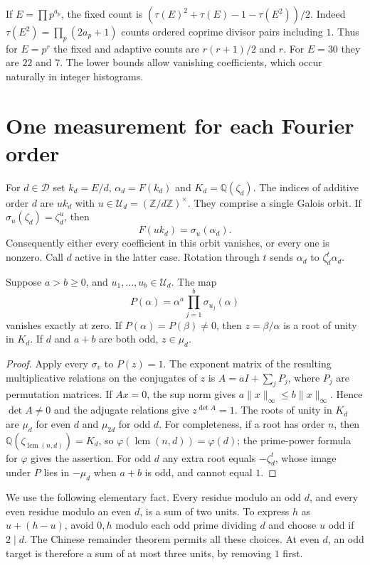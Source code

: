 \documentclass[11pt,letterpaper]{article}
\newcommand{\Z}{\mathbb Z}\newcommand{\Q}{\mathbb Q}\newcommand{\C}{\mathbb C}
\newcommand{\D}{\mathcal D}\newcommand{\U}{\mathcal U}
\DeclareMathOperator{\lcm}{lcm}
\begin{document}
If $E=\prod p^{a_p}$, the fixed count is $(\tau(E)^2+\tau(E)-1-\tau(E^2))/2$. Indeed $\tau(E^2)=\prod_p(2a_p+1)$ counts ordered coprime divisor pairs including $1$. Thus for $E=p^r$ the fixed and adaptive counts are $r(r+1)/2$ and $r$. For $E=30$ they are $22$ and $7$. The lower bounds allow vanishing coefficients, which occur naturally in integer histograms.

\newpage
\section{One measurement for each Fourier order}
For $d\in\D$ set $k_d=E/d$, $\alpha_d=F(k_d)$ and $K_d=\Q(\zeta_d)$. The indices of additive order $d$ are $uk_d$ with $u\in\U_d=(\Z/d\Z)^\times$. They comprise a single Galois orbit. If $\sigma_u(\zeta_d)=\zeta_d^u$, then
\begin{equation}\label{eq:galois}
 F(uk_d)=\sigma_u(\alpha_d).
\end{equation}
Consequently either every coefficient in this orbit vanishes, or every one is nonzero. Call $d$ active in the latter case. Rotation through $t$ sends $\alpha_d$ to $\zeta_d^t\alpha_d$.

\begin{lemma}\label{lem:factor}
Suppose $a>b\ge 0$, and $u_1,\ldots,u_b\in\U_d$. The map
\[
 P(\alpha)=\alpha^a\prod_{j=1}^b\sigma_{u_j}(\alpha)
\]
vanishes exactly at zero. If $P(\alpha)=P(\beta)\ne0$, then $z=\beta/\alpha$ is a root of unity in $K_d$. If $d$ and $a+b$ are both odd, $z\in\mu_d$.
\end{lemma}
\begin{proof}
Apply every $\sigma_v$ to $P(z)=1$. The exponent matrix of the resulting multiplicative relations on the conjugates of $z$ is $A=aI+\sum_j P_j$, where $P_j$ are permutation matrices. If $Ax=0$, the sup norm gives $a\|x\|_\infty\le b\|x\|_\infty$. Hence $\det A\ne0$ and the adjugate relations give $z^{\det A}=1$. The roots of unity in $K_d$ are $\mu_d$ for even $d$ and $\mu_{2d}$ for odd $d$. For completeness, if a root has order $n$, then $\Q(\zeta_{\lcm(n,d)})=K_d$, so $\varphi(\lcm(n,d))=\varphi(d)$; the prime-power formula for $\varphi$ gives the assertion. For odd $d$ any extra root equals $-\zeta_d^t$, whose image under $P$ lies in $-\mu_d$ when $a+b$ is odd, and cannot equal $1$.
\end{proof}

We use the following elementary fact. Every residue modulo an odd $d$, and every even residue modulo an even $d$, is a sum of two units. To express $h$ as $u+(h-u)$, avoid $0,h$ modulo each odd prime dividing $d$ and choose $u$ odd if $2\mid d$. The Chinese remainder theorem permits all these choices. At even $d$, an odd target is therefore a sum of at most three units, by removing $1$ first.
\end{document}
